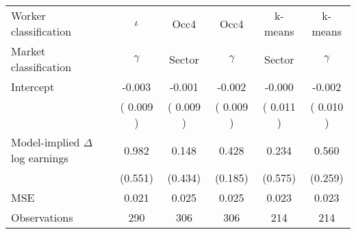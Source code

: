 \begin{tabular}{lccccc}
\toprule 
Worker classification 	 & $\iota$ 	 & Occ4 	 & Occ4 	 & k-means  	 & k-means  \\ 
Market classification 	 & $\gamma$ 	 & Sector 	 & $\gamma$ 	 & Sector  	 & $\gamma$  \\ 
\midrule 
Intercept & -0.003 & -0.001 & -0.002 & -0.000 & -0.002 \\ 
 & ( 0.009 ) & ( 0.009 ) & ( 0.009 ) & ( 0.011 ) & ( 0.010 ) \\ 
Model-implied $\Delta$ log earnings & 0.982 & 0.148 & 0.428 & 0.234 & 0.560 \\ 
 & (0.551) & (0.434) & (0.185) & (0.575) & (0.259) \\ 
\midrule 
MSE & 0.021 & 0.025 & 0.025 & 0.023 & 0.023 \\ 
Observations & 290 & 306 & 306 & 214 & 214 \\ 
\bottomrule 
\end{tabular}
